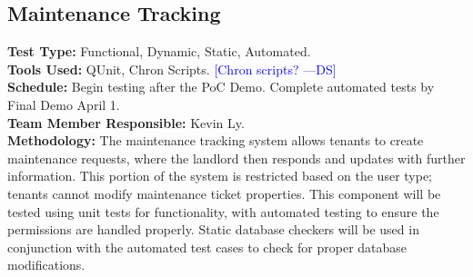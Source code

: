 \documentclass[12pt]{article}
\newcommand{\authornote}[3]{\textcolor{#1}{[#3 ---#2]}}
\newcommand{\authornote}[3]{}
\newcommand{\ds}[1]{\authornote{blue}{DS}{#1}}
\begin{document}
\subsection{Maintenance Tracking}
\textbf{Test Type:} Functional, Dynamic, Static, Automated. \\
\textbf{Tools Used:} QUnit, Chron Scripts. \ds{Chron scripts?}\\
\textbf{Schedule:} Begin testing after the PoC Demo. Complete automated tests by Final Demo April 1. \\
\textbf{Team Member Responsible:} Kevin Ly. \\
\textbf{Methodology:} The maintenance tracking system allows tenants to create maintenance requests, where the landlord then responds and updates with further information. This portion of the system is restricted based on the user type; tenants cannot modify maintenance ticket properties. This component will be tested using unit tests for functionality, with automated testing to ensure the permissions are handled properly. Static database checkers will be used in conjunction with the automated test cases to check for proper database modifications.
\end{document}
